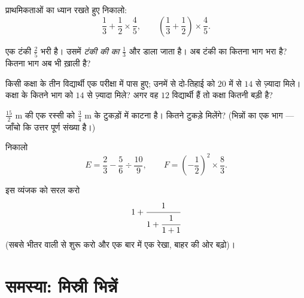 \begin{exercise}[$\star$]\label{exo:g8:fractions:7}
प्राथमिकताओं का ध्यान रखते हुए निकालो:
\[
\frac{1}{3} + \frac{1}{2} \times \frac{4}{5},
\qquad
\left(\frac{1}{3} + \frac{1}{2}\right) \times \frac{4}{5} .
\]
\end{exercise}

\begin{exercise}[$\star\star$]\label{exo:g8:fractions:8}
एक टंकी $\frac{2}{5}$ भरी है। उसमें \emph{टंकी की  का}
$\frac{1}{3}$ और डाला जाता है। अब टंकी का कितना भाग भरा है? कितना
भाग अब भी ख़ाली है?
\end{exercise}

\begin{exercise}[$\star\star$]\label{exo:g8:fractions:9}
किसी कक्षा के तीन  विद्यार्थी एक परीक्षा में पास हुए; उनमें से
दो-तिहाई को $20$ में से $14$ से ज़्यादा मिले। कक्षा के कितने भाग को
$14$ से ज़्यादा मिले? अगर वह $12$ विद्यार्थी हैं तो कक्षा कितनी
बड़ी है?
\end{exercise}

\begin{exercise}[$\star\star$]\label{exo:g8:fractions:10}
$\frac{15}{2}$ m की एक रस्सी को $\frac{3}{4}$ m के टुकड़ों में काटना
है। कितने टुकड़े मिलेंगे? (भिन्नों का एक भाग --- जाँचो कि उत्तर पूर्ण
संख्या है।)
\end{exercise}

\begin{exercise}[$\star\star$]\label{exo:g8:fractions:11}
निकालो
\[
E = \frac{2}{3} - \frac{5}{6} \div \frac{10}{9},
\qquad
F = \left(-\frac{1}{2}\right)^2 \times \frac{8}{3} .
\]
\end{exercise}

\begin{exercise}[$\star\star\star$]\label{exo:g8:fractions:12}
इस व्यंजक को सरल करो
\[
1 + \cfrac{1}{1 + \cfrac{1}{1 + 1}}
\]
(सबसे भीतर वाली  से शुरू करो और एक बार में एक रेखा, बाहर की ओर
बढ़ो)।
\end{exercise}

\section{समस्या: मिस्री भिन्नें}

